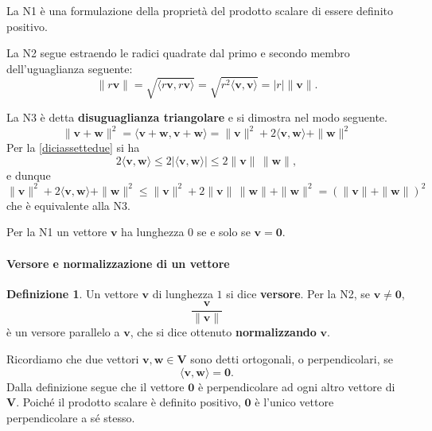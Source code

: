 \documentclass{article}
\theoremstyle{plain}
\theoremstyle{definition}
\newtheorem{defn}{Definizione}[section]
\theoremstyle{remark}
\begin{document}
\vspace{10pt}

La N1 è una formulazione della proprietà del prodotto scalare di essere definito positivo.

\vspace{10pt}

La N2 segue estraendo le radici quadrate dal primo e secondo membro dell'uguaglianza seguente:
\[\|r\mathbf{v}\|=\sqrt{\langle r \mathbf{v}, r \mathbf{v} \rangle}=\sqrt{r^2\langle \mathbf{v}, \mathbf{v} \rangle}=|r|\|\mathbf{v}\|.\]

\vspace{10pt}

La N3 è detta \textbf{disuguaglianza triangolare} e si dimostra nel modo seguente. 
\[\| \mathbf{v} + \mathbf{w} \|^2 = \langle \mathbf{v} + \mathbf{w}, \mathbf{v} + \mathbf{w} \rangle 
= \| \mathbf{v} \|^2 + 2 \langle \mathbf{v}, \mathbf{w} \rangle + \| \mathbf{w} \|^2 \]
Per la \ref{diciassettedue} si ha
\[2 \langle \mathbf{v}, \mathbf{w} \rangle\leq 2|\langle \mathbf{v}, \mathbf{w} \rangle|\leq2\|\mathbf{v}\| \, \|\mathbf{w}\|,\]
e dunque
\[\| \mathbf{v} \|^2 + 2 \langle \mathbf{v}, \mathbf{w} \rangle + \| \mathbf{w} \|^2\leq \| \mathbf{v} \|^2 + 2 \| \mathbf{v} \| \, \| \mathbf{w} \| + \| \mathbf{w} \|^2 = (\| \mathbf{v} \| + \| \mathbf{w} \|)^2\]
che è equivalente alla N3.

\vspace{10pt}

Per la N1 un vettore $\mathbf{v}$ ha lunghezza $0$ se e solo se $\mathbf{v} = \mathbf{0}$.

\vspace{10pt}

\paragraph{Versore e normalizzazione di un vettore}
\begin{bxthm}
\begin{defn}
Un vettore $\mathbf{v}$ di lunghezza $1$ si dice \textbf{versore}. Per la N2, se $\mathbf{v} \neq \mathbf{0}$, 
\[\dfrac{\mathbf{v}}{\| \mathbf{v} \|}\]
è un versore parallelo a $\mathbf{v}$, che si dice ottenuto \textbf{normalizzando} $\mathbf{v}$.    
\end{defn}
\end{bxthm}

\vspace{10pt}

Ricordiamo che due vettori $\mathbf{v}, \mathbf{w} \in \mathbf{V}$ sono detti ortogonali, o perpendicolari, se 
\[
\langle \mathbf{v}, \mathbf{w} \rangle = \mathbf{0}.
\]
Dalla definizione segue che il vettore $\mathbf{0}$ è perpendicolare ad ogni altro vettore di $\mathbf{V}$. 
Poiché il prodotto scalare è definito positivo, $\mathbf{0}$ è l'unico vettore perpendicolare a sé stesso.
\end{document}
